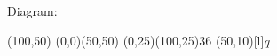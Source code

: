 \documentclass{article}
\begin{document}
Diagram:
\begin{axopicture}(100,50)
\Line[arrow](0,0)(50,50)
\Gluon(0,25)(100,25){3}{6}
\Text(50,10)[l]{$q$}
\end{axopicture}
\end{document}
